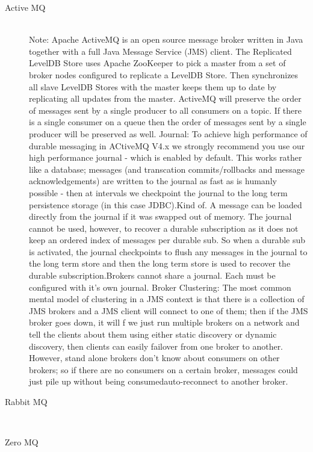 \begin{description}
    \item [Active MQ] \hfill \\
        {Note: Apache ActiveMQ is an open source message broker written in Java
    together with a full Java Message Service (JMS) client. The Replicated
    LevelDB Store uses Apache ZooKeeper to pick a master from a set of broker
    nodes configured to replicate a LevelDB Store. Then synchronizes all slave
    LevelDB Stores with the master keeps them up to date by replicating all
    updates from the master. ActiveMQ will preserve the order of messages sent
    by a single producer to all consumers on a topic. If there is a single
    consumer on a queue then the order of messages sent by a single producer
    will be preserved as well. Journal: To achieve high performance of durable
    messaging in ACtiveMQ V4.x we strongly recommend you use our high
    performance journal - which is enabled by default. This works rather like a
    database; messages (and transcation commits/rollbacks and message
    acknowledgements) are written to the journal as fast as is humanly possible
    - then at intervals we checkpoint the journal to the long term persistence
    storage (in this case JDBC).Kind of. A message can be loaded directly from the journal if it was swapped out of memory.
    The journal cannot be used, however, to recover a durable subscription as it
    does not keep an ordered index of messages per durable sub. So when a durable
    sub is activated, the journal checkpoints to flush any messages in the journal
    to the long term store and then the long term store is used to recover the
    durable subscription.Brokers cannot share a journal. Each must be
configured with it's own journal. Broker Clustering: The most common mental model of clustering in
a JMS context is that there is a collection of JMS brokers and a JMS client
will connect to one of them; then if the JMS broker goes down, it will
f we just run multiple brokers on a network and tell the clients about them
using either static discovery or dynamic discovery, then clients can easily
failover from one broker to another. However, stand alone brokers don't know
about consumers on other brokers; so if there are no consumers on a certain
broker, messages could just pile up without being consumedauto-reconnect to
another broker. } 

\item [Rabbit MQ] \hfill \\ {} \item [Zero
        MQ] \hfill \\
    {}
\end{description}


